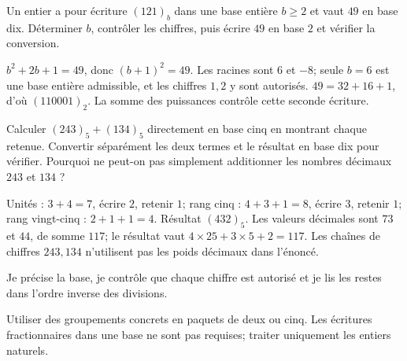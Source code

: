 \label{t11s-c11-p01}
Un entier a pour écriture $(121)_b$ dans une base entière $b\ge2$ et vaut $49$ en base dix. Déterminer $b$, contrôler les chiffres, puis écrire $49$ en base $2$ et vérifier la conversion.
\begin{corrige}\label{sol-t11s-c11-p01}
$b^2+2b+1=49$, donc $(b+1)^2=49$. Les racines sont $6$ et $-8$; seule $b=6$ est une base entière admissible, et les chiffres $1,2$ y sont autorisés. $49=32+16+1$, d’où $(110001)_2$. La somme des puissances contrôle cette seconde écriture.
\end{corrige}
\label{t11s-c11-p02}
Calculer $(243)_5+(134)_5$ directement en base cinq en montrant chaque retenue. Convertir séparément les deux termes et le résultat en base dix pour vérifier. Pourquoi ne peut-on pas simplement additionner les nombres décimaux $243$ et $134$ ?
\begin{corrige}\label{sol-t11s-c11-p02}
Unités : $3+4=7$, écrire $2$, retenir $1$; rang cinq : $4+3+1=8$, écrire $3$, retenir $1$; rang vingt-cinq : $2+1+1=4$. Résultat $(432)_5$. Les valeurs décimales sont $73$ et $44$, de somme $117$; le résultat vaut $4\times25+3\times5+2=117$. Les chaînes de chiffres $243,134$ n’utilisent pas les poids décimaux dans l’énoncé.
\end{corrige}

\begin{jemeteste}Je précise la base, je contrôle que chaque chiffre est autorisé et je lis les restes dans l’ordre inverse des divisions.\end{jemeteste}
\begin{notepourlaclasse}Utiliser des groupements concrets en paquets de deux ou cinq. Les écritures fractionnaires dans une base ne sont pas requises; traiter uniquement les entiers naturels.\end{notepourlaclasse}
